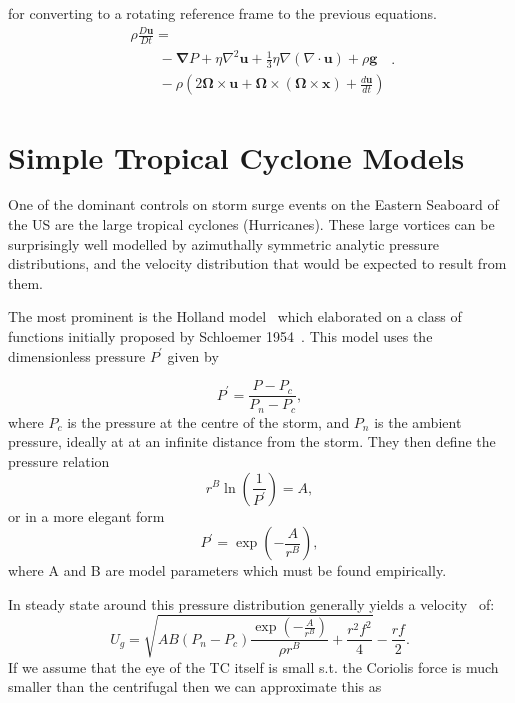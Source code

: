for converting to a rotating reference frame to the previous equations.
\begin{equation}
\begin{array}{l}
\rho \frac{D \mathbf{u}}{D t}=\\\quad\quad-\boldsymbol{\nabla} P+
\eta \nabla^{2} \mathbf{u}+\frac{1}{3} \eta \nabla(\nabla \cdot \mathbf{u})
+\rho \mathbf{g}\\\quad\quad-\rho\left(2 \mathbf{\Omega} \times \mathbf{u}
+\mathbf{\Omega} \times(\mathbf{\Omega} \times \mathbf{x})
+\frac{d \mathbf{u}}{d t}\right)\end{array}.
\tag{R-Momentum}
\end{equation}



\section{Simple Tropical Cyclone Models}

One of the dominant controls on storm surge events on the Eastern Seaboard
 of the US are the large tropical cyclones (Hurricanes).
  These large vortices can be surprisingly well modelled by azimuthally
   symmetric analytic pressure distributions, and the velocity distribution
    that would be expected to result from them.

The most prominent is the  Holland model~\cite{holland1980analytic,holland2010revised}
 which elaborated on a class of functions initially proposed by Schloemer 1954~\cite{schloemer1954analysis}.
  This model uses the dimensionless pressure \( P^{\prime}\) given by

\begin{equation}
    P^{\prime}=\dfrac{P-P_{c}}{P_{n}-P_{c}},
\end{equation}
where $P_c$ is the pressure at the centre of the storm, and $P_n$ is
the ambient pressure, ideally at at an infinite distance from the storm.
They then define the pressure relation
\begin{equation}
    r^{B}\ln(\frac{1}{P^{\prime}})=A,
\end{equation}or in a more elegant form
\begin{equation}
P^{\prime}=\exp{(-\frac{A}{r^B})},
\end{equation}
where A and B are model parameters which must be found empirically.

In steady state around this  pressure distribution generally yields a
 velocity~\cite{roisin2010GFD} of:
\begin{equation}
    U_g = \sqrt{AB(P_{n} - P_{c})\frac{\exp{(-\frac{A}{r^{B}})}}{\rho r^{B}}
     +\frac{r^2f^2}{4}}-\frac{rf}{2}.
\end{equation}
If we assume that the eye of the TC itself is small s.t. the Coriolis force
 is much smaller than the centrifugal then we can approximate this as

